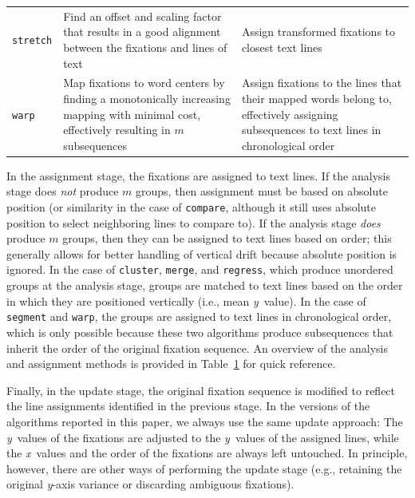 \documentclass[doc,biblatex]{apa7}
\begin{document}
\begin{table}
\begin{center}
\begin{threeparttable}
\begin{tabular}{l p{6.5cm} p{6.5cm}}
	\texttt{stretch}   & Find an offset and scaling factor that results in a good alignment between the fixations and lines of text & Assign transformed fixations to closest text lines \\
	\texttt{warp}    & Map fixations to word centers by finding a monotonically increasing mapping with minimal cost, effectively resulting in $m$ subsequences & Assign fixations to the lines that their mapped words belong to, effectively assigning subsequences to text lines in chronological order \\ \hline
	\end{tabular}
	\label{table2}
	\end{threeparttable}
	\end{center}
	\end{table}

In the assignment stage, the fixations are assigned to text lines. If the analysis stage does \textit{not} produce $m$ groups, then assignment must be based on absolute position (or similarity in the case of \texttt{compare}, although it still uses absolute position to select neighboring lines to compare to). If the analysis stage \textit{does} produce $m$ groups, then they can be assigned to text lines based on order; this generally allows for better handling of vertical drift because absolute position is ignored. In the case of \texttt{cluster}, \texttt{merge}, and \texttt{regress}, which produce unordered groups at the analysis stage, groups are matched to text lines based on the order in which they are positioned vertically (i.e., mean \textit{y}~value). In the case of \texttt{segment} and \texttt{warp}, the groups are assigned to text lines in chronological order, which is only possible because these two algorithms produce subsequences that inherit the order of the original fixation sequence. An overview of the analysis and assignment methods is provided in Table~\ref{table2} for quick reference.

Finally, in the update stage, the original fixation sequence is modified to reflect the line assignments identified in the previous stage. In the versions of the algorithms reported in this paper, we always use the same update approach: The \textit{y}~values of the fixations are adjusted to the \textit{y}~values of the assigned lines, while the \textit{x}~values and the order of the fixations are always left untouched. In principle, however, there are other ways of performing the update stage (e.g., retaining the original \textit{y}-axis variance or discarding ambiguous fixations).
\end{document}
